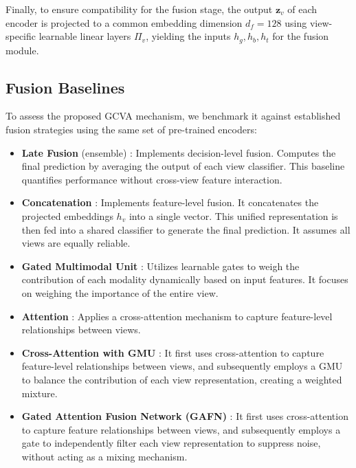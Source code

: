 \documentclass[journal]{IEEEtran}
\begin{document}
Finally, to ensure compatibility for the fusion stage, the output $\mathbf{z}_v$ of each encoder is projected to a common embedding dimension $d_f=128$ using view-specific learnable linear layers $\Pi_v$, yielding the inputs $h_g, h_b, h_t$ for the fusion module.



\subsection{Fusion Baselines} \label{subsec:baselines}

To assess the proposed GCVA mechanism, we benchmark it against established fusion strategies using the same set of pre-trained encoders:

\begin{itemize}
    \item \textbf{Late Fusion} (ensemble) \cite{wang2020makes}: Implements decision-level fusion. Computes the final prediction by averaging the output of each view classifier. This baseline quantifies performance without cross-view feature interaction.
    \item \textbf{Concatenation} \cite{baltruvsaitis2018multimodal}: Implements feature-level fusion. It concatenates the projected embeddings $h_v$ into a single vector. This unified representation is then fed into a shared classifier to generate the final prediction. It assumes all views are equally reliable.
    \item \textbf{Gated Multimodal Unit} \cite{arevalo2020gated}: Utilizes learnable gates to weigh the contribution of each modality dynamically based on input features. It focuses on weighing the importance of the entire view. 
    \item \textbf{Attention} \cite{tsai2019multimodal}: Applies a cross-attention mechanism to capture feature-level relationships between views.
    \item \textbf{Cross-Attention with GMU} \cite{ilias2024cross}: It first uses cross-attention to capture feature-level relationships between views, and subsequently employs a GMU to balance the contribution of each view representation, creating a weighted mixture.
    
    \item \textbf{Gated Attention Fusion Network (GAFN)} \cite{du2022gatedattention}: It first uses cross-attention to capture feature relationships between views, and subsequently employs a gate to independently filter each view representation to suppress noise, without acting as a mixing mechanism.
\end{itemize}
\end{document}
